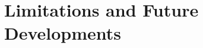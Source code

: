 \chapter{Limitations and Future Developments}\label{limitations}\label{futures}\label{section \thechapter} 

